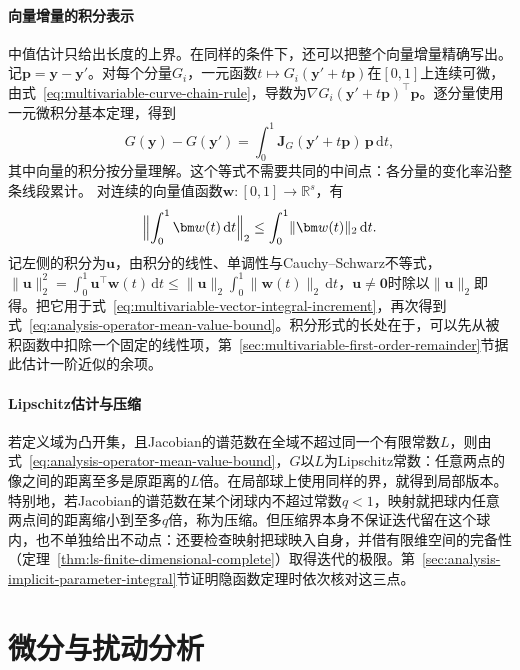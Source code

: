 \paragraph{向量增量的积分表示}
中值估计只给出长度的上界。在同样的条件下，还可以把整个向量增量精确写出。记$\bm p=\bm y-\bm y'$。对每个分量$G_i$，一元函数$t\mapsto G_i(\bm y'+t\bm p)$在$[0,1]$上连续可微，由式~\eqref{eq:multivariable-curve-chain-rule}，导数为$\nabla G_i(\bm y'+t\bm p)^\top\bm p$。逐分量使用一元微积分基本定理，得到
\begin{equation}
 G(\bm y)-G(\bm y')=\int_0^1\bm J_G(\bm y'+t\bm p)\,\bm p\,\mathrm dt,
\label{eq:multivariable-vector-integral-increment}
\end{equation}
其中向量的积分按分量理解。这个等式不需要共同的中间点：各分量的变化率沿整条线段累计。
对连续的向量值函数$\bm w:[0,1]\to\mathbb R^s$，有
\[
 \Bigl\lVert\int_0^1\bm w(t)\,\mathrm dt\Bigr\rVert_2\leq\int_0^1\lVert\bm w(t)\rVert_2\,\mathrm dt .
\]
记左侧的积分为$\bm u$，由积分的线性、单调性与Cauchy--Schwarz不等式，$\lVert\bm u\rVert_2^2=\int_0^1\bm u^\top\bm w(t)\,\mathrm dt\leq\lVert\bm u\rVert_2\int_0^1\lVert\bm w(t)\rVert_2\,\mathrm dt$，$\bm u\neq\bm0$时除以$\lVert\bm u\rVert_2$即得。把它用于式~\eqref{eq:multivariable-vector-integral-increment}，再次得到式~\eqref{eq:analysis-operator-mean-value-bound}。积分形式的长处在于，可以先从被积函数中扣除一个固定的线性项，第~\ref{sec:multivariable-first-order-remainder}节据此估计一阶近似的余项。

\paragraph{Lipschitz估计与压缩}
若定义域为凸开集，且Jacobian的谱范数在全域不超过同一个有限常数$L$，则由式~\eqref{eq:analysis-operator-mean-value-bound}，$G$以$L$为Lipschitz常数：任意两点的像之间的距离至多是原距离的$L$倍。在局部球上使用同样的界，就得到局部版本。
特别地，若Jacobian的谱范数在某个闭球内不超过常数$q<1$，映射就把球内任意两点间的距离缩小到至多$q$倍，称为压缩。但压缩界本身不保证迭代留在这个球内，也不单独给出不动点：还要检查映射把球映入自身，并借有限维空间的完备性（定理~\ref{thm:ls-finite-dimensional-complete}）取得迭代的极限。第~\ref{sec:analysis-implicit-parameter-integral}节证明隐函数定理时依次核对这三点。

\section{微分与扰动分析}
\label{sec:multivariable-differential-perturbation}

